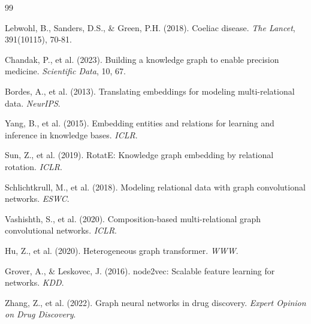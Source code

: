 \documentclass[twoside]{article}
\begin{document}



\begin{thebibliography}{99}

Lebwohl, B., Sanders, D.S., \& Green, P.H. (2018).
Coeliac disease.
\textit{The Lancet}, 391(10115), 70-81.

Chandak, P., et al. (2023).
Building a knowledge graph to enable precision medicine.
\textit{Scientific Data}, 10, 67.

Bordes, A., et al. (2013).
Translating embeddings for modeling multi-relational data.
\textit{NeurIPS}.

Yang, B., et al. (2015).
Embedding entities and relations for learning and inference in knowledge bases.
\textit{ICLR}.

Sun, Z., et al. (2019).
RotatE: Knowledge graph embedding by relational rotation.
\textit{ICLR}.

Schlichtkrull, M., et al. (2018).
Modeling relational data with graph convolutional networks.
\textit{ESWC}.

Vashishth, S., et al. (2020).
Composition-based multi-relational graph convolutional networks.
\textit{ICLR}.

Hu, Z., et al. (2020).
Heterogeneous graph transformer.
\textit{WWW}.

Grover, A., \& Leskovec, J. (2016).
node2vec: Scalable feature learning for networks.
\textit{KDD}.

Zhang, Z., et al. (2022).
Graph neural networks in drug discovery.
\textit{Expert Opinion on Drug Discovery}.

\end{thebibliography}
\end{document}
